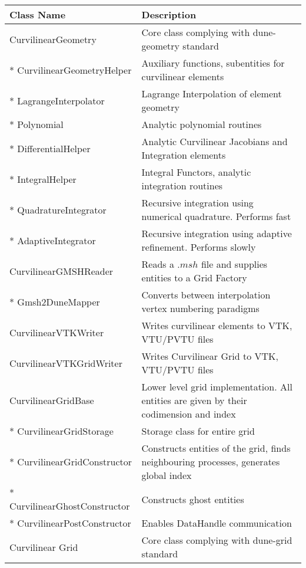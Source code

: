 \noindent
\begin{tabularx}{\textwidth}{ l | X }
\hline
   Class Name & Description \\ \hline
   CurvilinearGeometry                & Core class complying with dune-geometry standard \\ \hline
   * CurvilinearGeometryHelper        & Auxiliary functions, subentities for curvilinear elements \\ \hline
   * LagrangeInterpolator             & Lagrange Interpolation of element geometry \\ \hline
   * Polynomial                       & Analytic polynomial routines \\ \hline
   * DifferentialHelper               & Analytic Curvilinear Jacobians and Integration elements \\ \hline
   * IntegralHelper                   & Integral Functors, analytic integration routines  \\ \hline
   * QuadratureIntegrator             & Recursive integration using numerical quadrature. Performs fast \\ \hline
   * AdaptiveIntegrator               & Recursive integration using adaptive refinement. Performs slowly \\ \hline
  CurvilinearGMSHReader               & Reads a $.msh$ file and supplies entities to a Grid Factory \\ \hline
  * Gmsh2DuneMapper                   & Converts between interpolation vertex numbering paradigms \\ \hline
  CurvilinearVTKWriter                & Writes curvilinear elements to VTK, VTU/PVTU files \\ \hline
  CurvilinearVTKGridWriter            & Writes Curvilinear Grid to VTK, VTU/PVTU files \\ \hline
  CurvilinearGridBase                 & Lower level grid implementation. All entities are given by their codimension and index \\ \hline
  * CurvilinearGridStorage            & Storage class for entire grid \\ \hline
  * CurvilinearGridConstructor        & Constructs entities of the grid, finds neighbouring processes, generates global index \\ \hline
  * CurvilinearGhostConstructor       & Constructs ghost entities \\ \hline
  * CurvilinearPostConstructor        & Enables DataHandle communication \\ \hline
  Curvilinear Grid                    & Core class complying with dune-grid standard \\ \hline

\end{tabularx}
